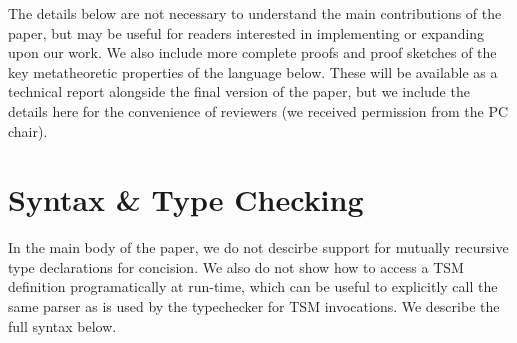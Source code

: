 \documentclass{sig-alternate}
\begin{document}


%

%
%
\newpage
\onecolumn
\appendix
The details below are not necessary to understand the main contributions of the paper, but may be useful for readers interested in implementing or expanding upon our work. We also include more complete proofs and proof sketches of the key metatheoretic properties of the language below. These will be available as a technical report alongside the final version of the paper, but we include the details here for the convenience of reviewers (we received permission from the PC chair).

\section{Syntax \& Type Checking}
In the main body of the paper, we do not descirbe support for mutually recursive type declarations for concision. We also do not show how to access a TSM definition programatically at run-time, which can be useful to explicitly call the same parser as is used by the typechecker for TSM invocations. We describe the full syntax below.
\end{document}
